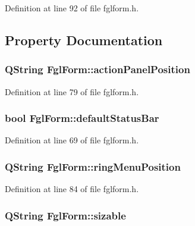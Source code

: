 Definition at line 92 of file fglform.h.



\subsection{Property Documentation}
\hypertarget{classFglForm_a8ca117823135914a8977974b455372a1}{
\subsubsection[{actionPanelPosition}]{\setlength{\rightskip}{0pt plus 5cm}QString FglForm::actionPanelPosition}}
\label{classFglForm_a8ca117823135914a8977974b455372a1}


Definition at line 79 of file fglform.h.

\hypertarget{classFglForm_aed179664fb0f0999affabd3b746edae7}{
\subsubsection[{defaultStatusBar}]{\setlength{\rightskip}{0pt plus 5cm}bool FglForm::defaultStatusBar}}
\label{classFglForm_aed179664fb0f0999affabd3b746edae7}


Definition at line 69 of file fglform.h.

\hypertarget{classFglForm_ab0e939affc05fa6c0297dcf7c257b25f}{
\subsubsection[{ringMenuPosition}]{\setlength{\rightskip}{0pt plus 5cm}QString FglForm::ringMenuPosition}}
\label{classFglForm_ab0e939affc05fa6c0297dcf7c257b25f}


Definition at line 84 of file fglform.h.

\hypertarget{classFglForm_a2e26a9f76fe7c63c8103ac4b04776e81}{
\subsubsection[{sizable}]{\setlength{\rightskip}{0pt plus 5cm}QString FglForm::sizable}}
\label{classFglForm_a2e26a9f76fe7c63c8103ac4b04776e81}


